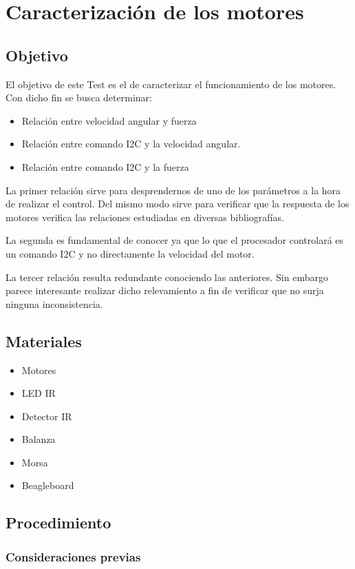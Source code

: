 \documentclass[spanish,12pt,a4paper,titlepage]{report}
\begin{document}
\chapter{Caracterización de los motores}
\section{Objetivo}
El objetivo de este Test es el de caracterizar el funcionamiento de los motores. Con dicho fin se busca determinar:

\begin{itemize}
\item Relación entre velocidad angular y fuerza
\item Relación entre comando I2C y la velocidad angular.
\item Relación entre comando I2C y la fuerza
\end{itemize}

La primer relación sirve para desprendernos de uno de los parámetros a la hora de realizar el control. Del mismo modo sirve para verificar que la respuesta de los motores verifica las relaciones estudiadas en diversas bibliografías.

La segunda es fundamental de conocer ya que lo que el procesador controlará es un comando I2C y no directamente la velocidad del motor. 

La tercer relación resulta redundante conociendo las anteriores. Sin embargo parece interesante realizar dicho relevamiento a fin de verificar que no surja ninguna inconsistencia. 
\section{Materiales}
\begin{itemize}
\item Motores
\item LED IR
\item Detector IR
\item Balanza
\item Morsa
\item Beagleboard
\end{itemize}

\section{Procedimiento}

\subsection{Consideraciones previas}
\end{document}
